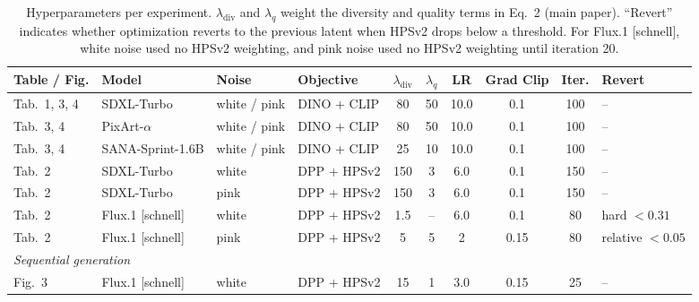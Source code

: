 \documentclass[10pt,twocolumn,letterpaper]{article}
\begin{document}
\begin{table}[h]
\centering
\caption{Hyperparameters per experiment. $\lambda_{\text{div}}$ and $\lambda_q$ weight 
the diversity and quality terms in Eq.~2 (main paper). ``Revert'' indicates whether 
optimization reverts to the previous latent when HPSv2 drops below a threshold. For Flux.1 [schnell], white noise used no HPSv2 weighting, and pink noise used no HPSv2 weighting until iteration 20.}
\label{tab:hparams_experiments}
\setlength{\tabcolsep}{4pt}
\begin{tabular}{llllcccccl}
\toprule
\textbf{Table / Fig.} & \textbf{Model} & \textbf{Noise} & \textbf{Objective} 
  & $\lambda_{\text{div}}$ & $\lambda_q$ & \textbf{LR} & \textbf{Grad Clip} 
  & \textbf{Iter.} & \textbf{Revert} \\
\midrule
Tab.~1, 3, 4  & SDXL-Turbo       & white / pink & DINO + CLIP  & 80  & 50 & 10.0 & 0.1  & 100 & -- \\
Tab.~3, 4     & PixArt-$\alpha$   & white / pink & DINO + CLIP  & 80  & 50 & 10.0 & 0.1  & 100 & -- \\
Tab.~3, 4     & SANA-Sprint-1.6B  & white / pink & DINO + CLIP  & 25  & 10 & 10.0 & 0.1  & 100 & -- \\
\midrule
Tab.~2        & SDXL-Turbo       & white        & DPP + HPSv2  & 150 & 3  & 6.0  & 0.1  & 150 & -- \\
Tab.~2        & SDXL-Turbo       & pink         & DPP + HPSv2  & 150 & 3  & 6.0  & 0.1   & 150 & -- \\
Tab.~2        & Flux.1 [schnell] & white        & DPP + HPSv2  & 1.5 & -- & 6.0  & 0.1  & 80  & hard $< 0.31$ \\
Tab.~2        & Flux.1 [schnell] & pink         & DPP + HPSv2  & 5 & 5 & 2  & 0.15  & 80 & relative $< 0.05$ \\
\midrule
\multicolumn{10}{l}{\textit{Sequential generation}} \\
Fig.~3        & Flux.1 [schnell] & white        & DPP + HPSv2  & 15  & 1  & 3.0  & 0.15 & 25  & -- \\
\bottomrule
\end{tabular}
\end{table}
\end{document}
